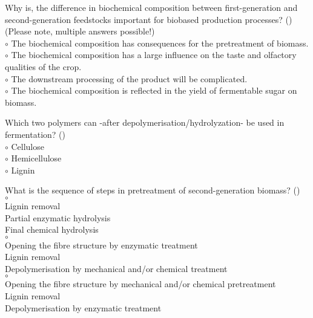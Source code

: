 \documentclass[]{beamer}
\begin{document}
\begin{CJK}{UTF8}{gbsn}
\begin{frame}[shrink] {} 
\addtocounter{questions}{1}
\color{blue}
Why is, the difference in biochemical composition between first-generation and second-generation feedstocks important for biobased production processes?
 ({})\\
(Please note, multiple answers possible!)
  \\
\color{black}
\setlength{\parindent}{-0.4cm}
{\color{red}$\circ$}  The biochemical composition has consequences for the pretreatment  of biomass.  \\
{\color{red}$\circ$} The biochemical composition has a large influence on the taste and olfactory qualities of the crop.  \\
{\color{red}$\circ$} The downstream processing of the product will be complicated.  \\
{\color{red}$\circ$}  The biochemical composition is reflected in the yield of fermentable sugar on biomass.  \\
\end{frame}


\begin{frame}[shrink] {} 
\addtocounter{questions}{1}
\color{blue}
  Which two polymers can -after depolymerisation/hydrolyzation- be used in fermentation? 
 ({})\\
\color{black}
\setlength{\parindent}{-0.4cm}
{\color{red}$\circ$}  Cellulose  \\
{\color{red}$\circ$}  Hemicellulose  \\
{\color{red}$\circ$} Lignin  \\
\end{frame}


\begin{frame}[shrink] {} 
\addtocounter{questions}{1}
\color{blue}
  What is the sequence of steps in pretreatment of second-generation biomass? 
 ({})\\
\color{black}
\setlength{\parindent}{-0.4cm}
{\color{red}$\circ$}    \\
Lignin removal\\
Partial enzymatic hydrolysis\\
Final chemical hydrolysis\\
{\color{red}$\circ$}    \\
Opening the fibre structure by enzymatic treatment \\
Lignin removal\\
Depolymerisation by mechanical and/or chemical treatment\\
{\color{red}$\circ$}    \\
Opening the fibre structure by mechanical and/or chemical pretreatment\\
Lignin removal\\
Depolymerisation by enzymatic treatment\\
\end{frame}


\end{CJK}
\end{document}
